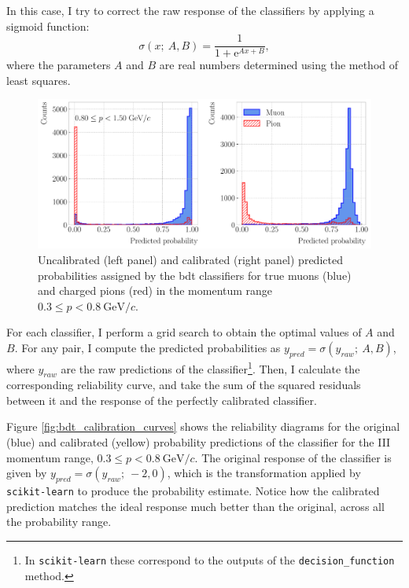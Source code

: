 In this case, I try to correct the raw response of the classifiers by applying a sigmoid function:
\begin{equation}
	\sigma(x;~A,B) = \frac{1}{1+\mathrm{e}^{Ax+B}},
\end{equation}
where the parameters $A$ and $B$ are real numbers determined using the method of least squares.

\begin{figure}[t]
	\centering
	\includegraphics[width=.95\linewidth]{Images/GArSoft_PID/BDT/ecal_bdt_output_example_calibration.pdf}
	\caption[Uncalibrated and calibrated predicted probabilities assigned by the \gls{bdt} classifier in the momentum range $0.3 \leq p < 0.8 ~ \mathrm{GeV}/c$.]{Uncalibrated (left panel) and calibrated (right panel) predicted probabilities assigned by the \gls{bdt} classifiers for true muons (blue) and charged pions (red) in the momentum range $0.3 \leq p < 0.8 ~ \mathrm{GeV}/c$.}
	\label{fig:bdt_calibration_output}
\end{figure}

For each classifier, I perform a grid search to obtain the optimal values of $A$ and $B$. For any pair, I compute the predicted probabilities as $y_{pred} = \sigma(y_{raw};~A,B)$, where $y_{raw}$ are the raw predictions of the classifier\footnote{In \texttt{scikit-learn} these correspond to the outputs of the \texttt{decision_function} method.}. Then, I calculate the corresponding reliability curve, and take the sum of the squared residuals between it and the response of the perfectly calibrated classifier.

Figure \ref{fig:bdt_calibration_curves} shows the reliability diagrams for the original (blue) and calibrated (yellow) probability predictions of the classifier for the III momentum range, $0.3 \leq p < 0.8 ~ \mathrm{GeV}/c$. The original response of the classifier is given by $y_{pred} = \sigma(y_{raw};~-2,0)$, which is the transformation applied by \texttt{scikit-learn} to produce the probability estimate. Notice how the calibrated prediction matches the ideal response much better than the original, across all the probability range.

